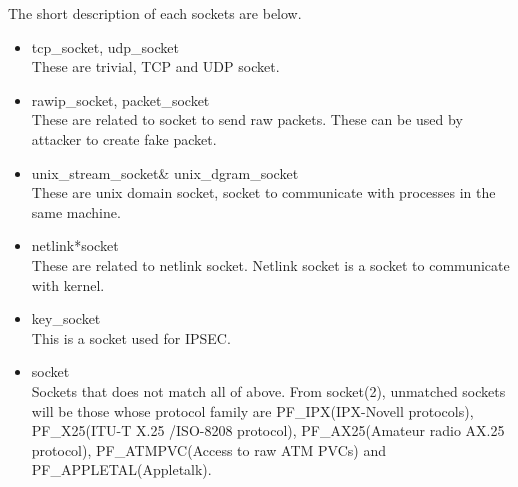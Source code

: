 \documentclass{article}
\begin{document}
The short description of each sockets are below.
\begin{itemize}
 \item tcp\_socket, udp\_socket\\
      These are trivial, TCP and UDP socket. 
 \item rawip\_socket, packet\_socket\\
       These are related to socket to send raw packets. These can be used
       by attacker to create fake packet. 
 \item  unix\_stream\_socket\& unix\_dgram\_socket\\
       These are unix domain socket, socket to communicate with
       processes in the same machine.
 \item netlink*socket\\
       These are related to netlink socket. Netlink socket is a socket
       to communicate with kernel.
 \item key\_socket\\
       This is a socket used for IPSEC.
 \item socket\\
       Sockets that does not match all of above. From socket(2), 
       unmatched sockets will be those whose protocol family are PF\_IPX(IPX-Novell protocols), PF\_X25(ITU-T X.25
       /ISO-8208 protocol), PF\_AX25(Amateur radio AX.25 protocol),
       PF\_ATMPVC(Access to raw ATM PVCs) and PF\_APPLETAL(Appletalk).   
\end{itemize}
\end{document}

